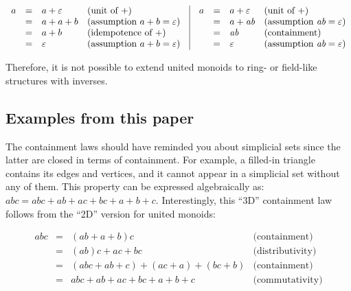 \documentclass[english,submission]{programming}
\begin{document}
\vspace{-5mm}
\begin{equation*}
\begin{array}{rcllcrcll}
a & = & a + \varepsilon & \text{(unit of $+$)} & \vrule & a & = & a + \varepsilon & \text{(unit of $+$)}\\
 & = & a + a + b & \text{(assumption $a + b = \varepsilon$)}& \vrule &  & = & a + \textit{ab} & \text{(assumption $\textit{ab} = \varepsilon$)} \\
 & = & a + b & \text{(idempotence of $+$)}& \vrule & & = & \textit{ab} & \text{(containment)} \\
 & = & \varepsilon & \text{(assumption $a + b = \varepsilon$)}& \vrule & & = & \varepsilon & \text{(assumption $\textit{ab} = \varepsilon$)}
\end{array}
\end{equation*}
\vspace{-3mm}

\noindent
Therefore, it is not possible to extend united monoids to ring- or field-like
structures with inverses.


\subsection{Examples from this paper}

The containment laws should have reminded you about simplicial sets since
the latter are closed in terms of containment. For example, a filled-in triangle
contains its edges and vertices, and it cannot appear in a simplicial set
without any of them. This property can be expressed algebraically as:
$\textit{abc} = \textit{abc} + \textit{ab} + \textit{ac} + \textit{bc} + a + b + c$.
Interestingly, this ``3D'' containment law follows from the ``2D'' version for
united monoids:

\vspace{-5mm}
\begin{equation*}
\begin{array}{rcll}
\textit{abc} & = & (\textit{ab} + a + b)c & \text{(containment)}\\
 & = & (\textit{ab})c + \textit{ac} + \textit{bc} & \text{(distributivity)}\\
 & = & (\textit{abc} + \textit{ab} + c) + (\textit{ac} + a) + (\textit{bc} + b) & \text{(containment)}\\
 & = & \textit{abc} + \textit{ab} + \textit{ac} + \textit{bc} + a + b + c & \text{(commutativity)}
\end{array}
\end{equation*}
\vspace{-3mm}
\end{document}
